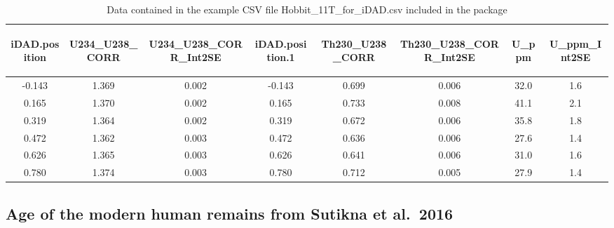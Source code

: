 \documentclass[]{elsarticle} %
\begin{document}
\begin{table}[ht]
\centering
\begin{tabular}{cccccccc}
  \hline
\begin{sideways} iDAD.position \end{sideways} & \begin{sideways} U234\_U238\_CORR \end{sideways} & \begin{sideways} U234\_U238\_CORR\_Int2SE \end{sideways} & \begin{sideways} iDAD.position.1 \end{sideways} & \begin{sideways} Th230\_U238\_CORR \end{sideways} & \begin{sideways} Th230\_U238\_CORR\_Int2SE \end{sideways} & \begin{sideways} U\_ppm \end{sideways} & \begin{sideways} U\_ppm\_Int2SE \end{sideways} \\ 
  \hline
-0.143 & 1.369 & 0.002 & -0.143 & 0.699 & 0.006 & 32.0 & 1.6 \\ 
  0.165 & 1.370 & 0.002 & 0.165 & 0.733 & 0.008 & 41.1 & 2.1 \\ 
  0.319 & 1.364 & 0.002 & 0.319 & 0.672 & 0.006 & 35.8 & 1.8 \\ 
  0.472 & 1.362 & 0.003 & 0.472 & 0.636 & 0.006 & 27.6 & 1.4 \\ 
  0.626 & 1.365 & 0.003 & 0.626 & 0.641 & 0.006 & 31.0 & 1.6 \\ 
  0.780 & 1.374 & 0.003 & 0.780 & 0.712 & 0.005 & 27.9 & 1.4 \\ 
   \hline
\end{tabular}
\caption{\label{tab:table-human}Data contained in the example CSV file Hobbit\_1\-1T\_for\_iDAD.csv included in the package} 
\end{table}

\hypertarget{age-of-the-modern-human-remains-from-sutikna-et-al.2016}{%
\subsection{Age of the modern human remains from Sutikna et al.~2016}\label{age-of-the-modern-human-remains-from-sutikna-et-al.2016}}
\end{document}

